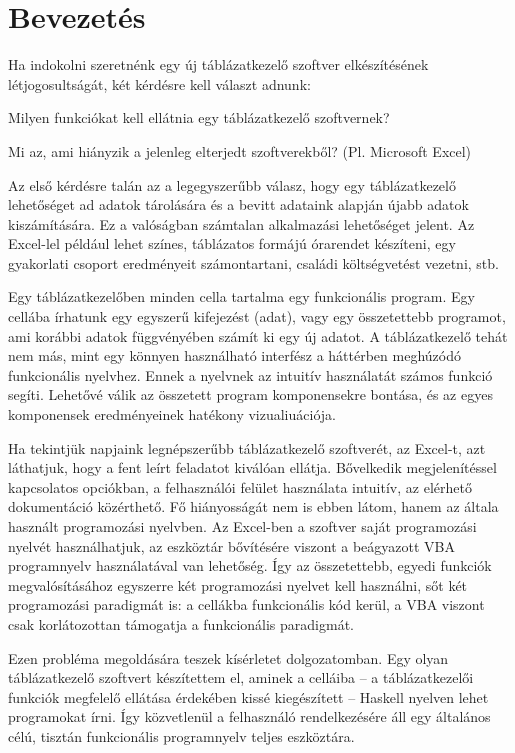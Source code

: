 \chapter{Bevezetés} %
\label{ch:intro}

Ha indokolni szeretnénk egy új táblázatkezelő szoftver elkészítésének létjogosultságát, két kérdésre kell választ adnunk:
\begin{compactenum}
	\item Milyen funkciókat kell ellátnia egy táblázatkezelő szoftvernek?
	\item Mi az, ami hiányzik a jelenleg elterjedt szoftverekből? (Pl. Microsoft Excel)
\end{compactenum}

Az első kérdésre talán az a legegyszerűbb válasz, hogy egy táblázatkezelő lehetőséget ad adatok tárolására és a bevitt adataink alapján újabb adatok kiszámítására. Ez a valóságban számtalan alkalmazási lehetőséget jelent. Az Excel-lel például lehet színes, táblázatos formájú órarendet készíteni, egy gyakorlati csoport eredményeit számontartani, családi költségvetést vezetni, stb. 

Egy táblázatkezelőben minden cella tartalma egy funkcionális program. Egy cellába írhatunk egy egyszerű kifejezést (adat), vagy egy összetettebb programot, ami korábbi adatok függvényében számít ki egy új adatot. A táblázatkezelő tehát nem más, mint egy könnyen használható interfész a háttérben meghúzódó funkcionális nyelvhez. Ennek a nyelvnek az intuitív használatát számos funkció segíti. Lehetővé válik az összetett program komponensekre bontása, és az egyes komponensek eredményeinek hatékony vizualiuációja.

Ha tekintjük napjaink legnépszerűbb táblázatkezelő szoftverét, az Excel-t, azt láthatjuk, hogy a fent leírt feladatot kiválóan ellátja. Bővelkedik megjelenítéssel kapcsolatos opciókban, a felhasználói felület használata intuitív, az elérhető dokumentáció közérthető. Fő hiányosságát nem is ebben látom, hanem az általa használt programozási nyelvben. Az Excel-ben a szoftver saját programozási nyelvét használhatjuk, az eszköztár bővítésére viszont a beágyazott VBA programnyelv használatával van lehetőség. Így az összetettebb, egyedi funkciók megvalósításához egyszerre két programozási nyelvet kell használni, sőt két programozási paradigmát is: a cellákba funkcionális kód kerül, a VBA viszont csak korlátozottan támogatja a funkcionális paradigmát. 

Ezen probléma megoldására teszek kísérletet dolgozatomban. Egy olyan táblázatkezelő szoftvert készítettem el, aminek a celláiba -- a táblázatkezelői funkciók megfelelő ellátása érdekében kissé kiegészített -- Haskell nyelven lehet programokat írni. Így közvetlenül a felhasználó rendelkezésére áll egy általános célú, tisztán funkcionális programnyelv teljes eszköztára. 